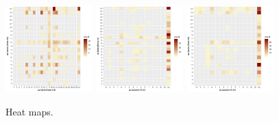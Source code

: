\documentclass[11pt,letterpaper]{article}
\begin{document}
\begin{figure}[t!]
\centering
\includegraphics[width=0.3\textwidth]{..//..//analyses/limitingcues/figures/heatmapforcexphoto.pdf}
\includegraphics[width=0.3\textwidth]{..//..//analyses/limitingcues/figures/heatmapchillxforce.pdf}
\includegraphics[width=0.3\textwidth]{..//..//analyses/limitingcues/figures/heatmapchillxphoto.pdf}
\caption{Heat maps.}
  \label{fig:heatmaps}
\end{figure}
\clearpage
\end{document}
